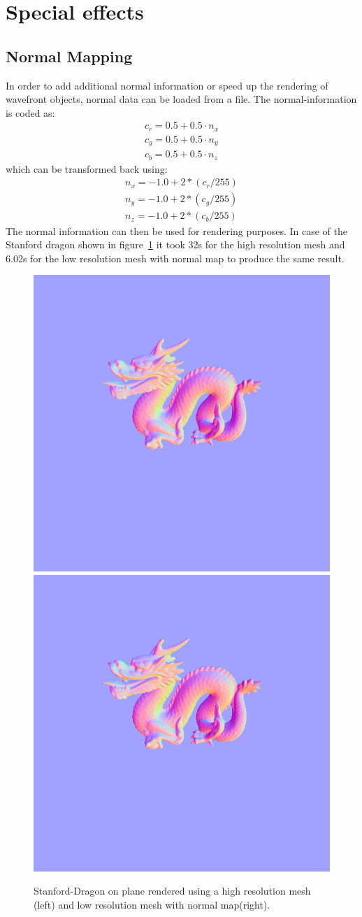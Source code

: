 \section{Special effects}
\subsection{Normal Mapping}
In order to add additional normal information or speed up the rendering of wavefront objects, normal data can be loaded from a file. The normal-information is coded as:
\begin{align*}
c_r = 0.5 + 0.5 \cdot n_x \\
c_g = 0.5 + 0.5 \cdot n_y \\
c_b = 0.5 + 0.5 \cdot n_z
\end{align*}
which can be transformed back using:
\begin{align}
n_x = -1.0 + 2*(c_r/255) \\
n_y = -1.0 + 2*(c_g/255) \\
n_z = -1.0 + 2*(c_b/255)
\end{align}
The normal information can then be used for rendering purposes. In case of the Stanford dragon shown in figure~\ref{fig:dragonNormlMap} it took 32s for the high resolution mesh and 6.02s for the low resolution mesh with normal map to produce the same result. 
\begin{figure}
\centering
\includegraphics[width=0.33\linewidth]{./img/dragonHighResMap}
\includegraphics[width=0.33\linewidth]{./img/dragonNormlMap}
\caption{Stanford-Dragon on plane rendered using a high resolution mesh (left) and low resolution mesh with normal map(right).}
\label{fig:dragonNormlMap}
\end{figure}


